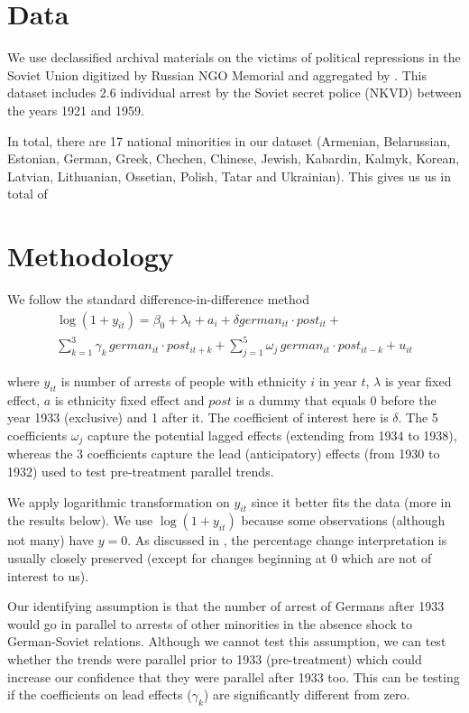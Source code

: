 \documentclass[12pt]{article}
\begin{document}
\section{Data}
We use declassified archival materials on the victims of political repressions in the Soviet Union digitized by Russian NGO Memorial and aggregated by \citet{zhukov_stalins_2018}. This dataset includes 2.6 individual arrest by the Soviet secret police (NKVD) between  the years 1921 and 1959.

In total, there are 17 national minorities in our dataset (Armenian, Belarussian, Estonian, German, Greek, Chechen, Chinese, Jewish, Kabardin, Kalmyk, Korean, Latvian, Lithuanian, Ossetian, Polish, Tatar and Ukrainian). This gives us us in total of 


\section{Methodology}
We follow the standard difference-in-difference method
\begin{multline}
 \log\left(1 + y_{it}\right) = \beta_0 +\lambda_t + a_i  + \delta german_{it} \cdot post_{it} + \\ \sum_{k= 1}^3 \gamma_k \, german_{it} \cdot post_{it+ k} + \sum_{j= 1}^5 \omega_j \, german_{it} \cdot post_{it - k}  + u_{it}   
\end{multline}

where $y_{it}$ is number of arrests of people with ethnicity $i$ in year $t$, $\lambda$ is year fixed effect, $a$ is ethnicity fixed effect and $post$ is a dummy that equals 0 before the year 1933 (exclusive) and 1 after it. The coefficient of interest here is $\delta$. The 5 coefficients $\omega_j$ capture the potential lagged effects (extending from 1934 to 1938), whereas the 3 coefficients capture the lead (anticipatory) effects (from 1930 to 1932) used to test pre-treatment parallel trends.  

 We apply logarithmic transformation on $y_{it}$ since it better fits the data (more in the results below).  We use $\log\left(1 + y_{it}\right)$ because some observations (although not many) have $y = 0$. As discussed in \citet[p. 193]{wooldridge_introductory_2015},  the percentage change interpretation is usually  closely preserved (except for changes beginning at 0 which are not of interest to us).   

Our identifying assumption is that the number of arrest of Germans after 1933 would go in parallel to arrests of other minorities in the absence shock to German-Soviet relations. Although we cannot test this assumption, we can test whether the trends were parallel prior to 1933 (pre-treatment) which could increase our confidence that they were parallel after 1933 too. This can be testing if the coefficients on lead effects ($\gamma_k$) are significantly different from zero.  
\end{document}

